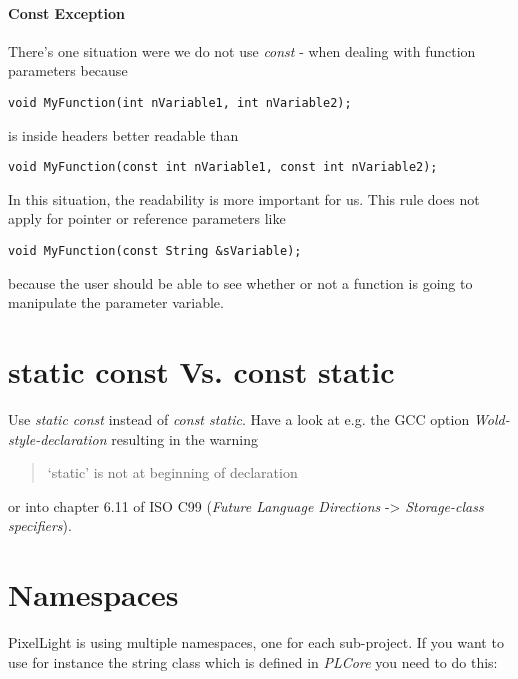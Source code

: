 \paragraph{Const Exception}
There's one situation were we do not use \emph{const} - when dealing with function parameters because

\begin{lstlisting}[caption=Function parameters]
void MyFunction(int nVariable1, int nVariable2);
\end{lstlisting}

is inside headers better readable than

\begin{lstlisting}[caption=Constant function parameters]
void MyFunction(const int nVariable1, const int nVariable2);
\end{lstlisting}

In this situation, the readability is more important for us. This rule does not apply for pointer or reference parameters like

\begin{lstlisting}[caption=Constant function pointer/reference parameter]
void MyFunction(const String &sVariable);
\end{lstlisting}

because the user should be able to see whether or not a function is going to manipulate the parameter variable.




\section{static const Vs. const static}
Use \emph{static const} instead of \emph{const static}. Have a look at e.g. the \ac{GCC} option \emph{Wold-style-declaration} resulting in the warning \begin{quote}`static' is not at beginning of declaration\end{quote} or into chapter 6.11 of ISO C99 (\emph{Future Language Directions} -> \emph{Storage-class specifiers}).




\section{Namespaces}
PixelLight is using multiple namespaces, one for each sub-project. If you want to use for instance the string class which is defined in \emph{PLCore} you need to do this:

